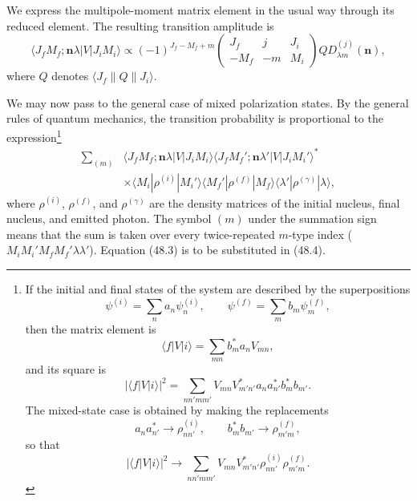 We express the multipole-moment matrix element in the usual way through its reduced element. The resulting transition amplitude is
\begin{equation}
\langle J_fM_f;\mathbf n\lambda|V|J_iM_i\rangle
\propto(-1)^{J_f-M_f+m}
\begin{pmatrix}J_f&j&J_i\\-M_f&-m&M_i\end{pmatrix}
QD_{\lambda m}^{(j)}(\mathbf n),
\tag{48.3}
\end{equation}
where $Q$ denotes $\langle J_f\|Q\|J_i\rangle$.

We may now pass to the general case of mixed polarization states. By the general rules of quantum mechanics, the transition probability is proportional to the
expression\footnote{If the initial and final states of the system are described by the superpositions
\[
\psi^{(i)}=\sum_n a_n\psi_n^{(i)},\qquad
\psi^{(f)}=\sum_m b_m\psi_m^{(f)},
\]
then the matrix element is
\[
\langle f|V|i\rangle=\sum_{mn}b_m^*a_nV_{mn},
\]
and its square is
\[
|\langle f|V|i\rangle|^2
=\sum_{nn'mm'}V_{mn}V_{m'n'}^*a_na_{n'}^*b_m^*b_{m'}.
\]
The mixed-state case is obtained by making the replacements
\[
a_na_{n'}^*\to\rho_{nn'}^{(i)},\qquad
b_m^*b_{m'}\to\rho_{m'm}^{(f)},
\]
so that
\[
|\langle f|V|i\rangle|^2\to
\sum_{nn'mm'}V_{mn}V_{m'n'}^*\rho_{nn'}^{(i)}\rho_{m'm}^{(f)}.
\]}
\begin{equation}
\begin{split}
\sum_{(m)}&\langle J_fM_f;\mathbf n\lambda|V|J_iM_i\rangle
\langle J_fM_f';\mathbf n\lambda'|V|J_iM_i'\rangle^*\\
&\times\langle M_i|\rho^{(i)}|M_i'\rangle
\langle M_f'|\rho^{(f)}|M_f\rangle
\langle\lambda'|\rho^{(\gamma)}|\lambda\rangle,
\end{split}
\tag{48.4}
\end{equation}
where $\rho^{(i)}$, $\rho^{(f)}$, and $\rho^{(\gamma)}$ are the density matrices of the initial nucleus, final nucleus, and emitted photon. The symbol $(m)$ under the summation sign means that the sum is taken over every twice-repeated $m$-type index ($M_iM_i'M_fM_f'\lambda\lambda'$). Equation (48.3) is to be substituted in (48.4).

